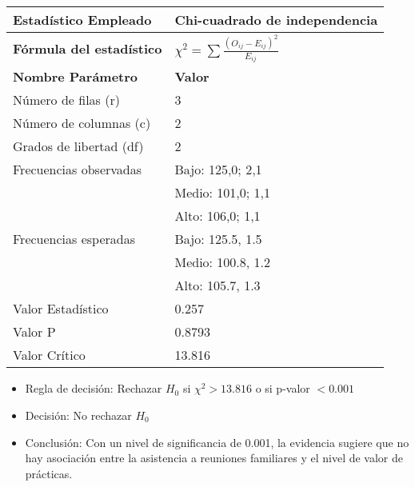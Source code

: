 \documentclass[12pt,a4paper]{article}
\begin{document}
\begin{tabular}{|m{7cm}|m{7cm}|}
\hline
\textbf{Estadístico Empleado} & Chi-cuadrado de independencia \\ \hline
\textbf{Fórmula del estadístico} & $\chi^2 = \sum \frac{(O_{ij} - E_{ij})^2}{E_{ij}}$ \\ \hline
\textbf{Nombre Parámetro} & \textbf{Valor} \\ \hline
Número de filas (r) & 3 \\ \hline
Número de columnas (c) & 2 \\ \hline
Grados de libertad (df) & 2 \\ \hline
Frecuencias observadas & Bajo: 125,0; 2,1 \\ \hline
& Medio: 101,0; 1,1 \\ \hline
& Alto: 106,0; 1,1 \\ \hline
Frecuencias esperadas & Bajo: 125.5, 1.5 \\ \hline
& Medio: 100.8, 1.2 \\ \hline
& Alto: 105.7, 1.3 \\ \hline
Valor Estadístico & 0.257 \\ \hline
Valor P & 0.8793 \\ \hline
Valor Crítico & 13.816 \\ \hline
\end{tabular}

\begin{itemize}
    \item Regla de decisión: Rechazar $H_0$ si $\chi^2 > 13.816$ o si p-valor $< 0.001$
    \item Decisión: No rechazar $H_0$
    \item Conclusión: Con un nivel de significancia de 0.001, la evidencia sugiere que no hay asociación entre la asistencia a reuniones familiares y el nivel de valor de prácticas.
\end{itemize}
\end{document}
